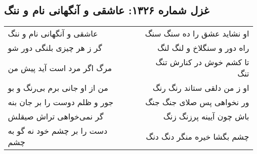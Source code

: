 \begin{center}
\section*{غزل شماره ۱۳۲۶: عاشقی و آنگهانی نام و ننگ}
\label{sec:1326}
\begin{longtable}{l p{0.5cm} r}
عاشقی و آنگهانی نام و ننگ
&&
او نشاید عشق را ده سنگ سنگ
\\
گر ز هر چیزی بلنگی دور شو
&&
راه دور و سنگلاخ و لنگ لنگ
\\
مرگ اگر مرد است آید پیش من
&&
تا کشم خوش در کنارش تنگ تنگ
\\
من از او جانی برم بی‌رنگ و بو
&&
او ز من دلقی ستاند رنگ رنگ
\\
جور و ظلم دوست را بر جان بنه
&&
ور نخواهی پس صلای جنگ جنگ
\\
گر نمی‌خواهی تراش صیقلش
&&
باش چون آیینه پرزنگ زنگ
\\
دست را بر چشم خود نه گو به چشم
&&
چشم بگشا خیره منگر دنگ دنگ
\\
\end{longtable}
\end{center}
